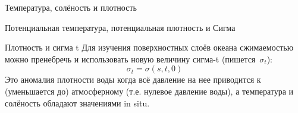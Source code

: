 \begin{chapter}{Температура, солёность и плотность}
\begin{section}{Потенциальная температура, потенциальная плотность и Сигма}
\begin{paragraph}{Плотность и сигма t}
Для изучения поверхностных слоёв океана сжимаемостью можно пренебречь
и использовать новую величину сигма-t (пишется~$\sigma_t$):
\begin{equation}
\sigma_t = \sigma(s,t,0) 
\end{equation}
Это аномалия плотности воды когда всё давление на нее приводится к
(уменьшается до) атмосферному (т.е. нулевое давление воды), а
температура и солёность обладают значениями in situ.
%
%
\end{paragraph}


\end{section}
\end{chapter}
